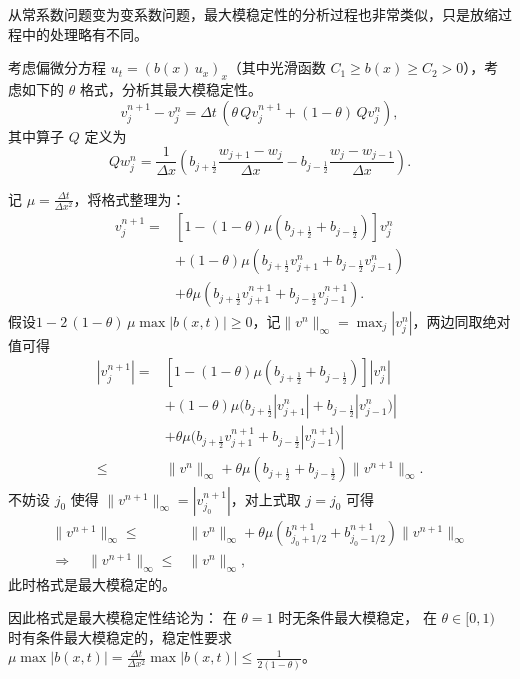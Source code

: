 从常系数问题变为变系数问题，最大模稳定性的分析过程也非常类似，只是放缩过程中的处理略有不同。

\begin{example}
    考虑偏微分方程 $u_t=(b(x)\, u_x)_x$（其中光滑函数 $C_1 \ge b(x) \ge C_2 > 0$），考虑如下的 $\theta$ 格式，分析其最大模稳定性。
    \[
        v^{n+1}_j - v^n_j = \Delta t\,(\theta\,Q v^{n+1}_j+(1-\theta)\, Q v^n_j),
    \]
    其中算子 $Q$ 定义为
    \[
        Q w^n_j=\frac{1}{\Delta x}\left(b_{j+\frac12}\frac{w_{j+1}-w_{j}}{\Delta x} - b_{j-\frac12}\frac{w_j-w_{j-1}}{\Delta x}\right).
    \]
\end{example}

\begin{solution*}
    记 $\mu = \frac{\Delta t}{\Delta x^2}$，将格式整理为：
    \begin{align*}
        [1+\theta \mu (b_{j+\frac12} + b_{j-\frac12})] v^{n+1}_j
        ={} & [1- (1-\theta) \mu (b_{j+\frac12}+b_{j-\frac12})] v^{n}_j                \\
            & + (1-\theta) \mu (b_{j+\frac12} v^n_{j+1} + b_{j-\frac12} v^n_{j-1})     \\
            & + \theta \mu (b_{j+\frac12} v^{n+1}_{j+1} + b_{j-\frac12} v^{n+1}_{j-1}).
    \end{align*}
    假设$1-2\,(1-\theta)\,\mu \max|b(x,t)|\ge0$，记$\|v^n\|_\infty = \max_j|v_j^n|$，两边同取绝对值可得
    \begin{align*}
        [1+\theta \mu (b_{j+\frac12} + b_{j-\frac12})] |v^{n+1}_j|
        ={}   & [1- (1-\theta) \mu (b_{j+\frac12}+b_{j-\frac12})] |v^{n}_j|                \\
              & + (1-\theta) \mu (b_{j+\frac12} |v^n_{j+1}| + b_{j-\frac12} |v^n_{j-1})|   \\
              & + \theta \mu (b_{j+\frac12} v^{n+1}_{j+1} + b_{j-\frac12} |v^{n+1}_{j-1})| \\
        \le{} & \|v^n\|_\infty
        + \theta \mu (b_{j+\frac12}  + b_{j-\frac12}) \|v^{n+1}\|_\infty.
    \end{align*}
    不妨设 $j_0$ 使得 $\|v^{n+1}\|_\infty = |v_{j_0}^{n+1}|$，对上式取 $j = j_0$ 可得
    \begin{align*}
        [1 + \theta \mu (b^{n+1}_{j_0+1/2}+b^{n+1}_{j_0-1/2})]\|v^{n+1}\|_\infty
        \le{}                                        & \|v^{n}\|_\infty + \theta \mu (b^{n+1}_{j_0+1/2}+b^{n+1}_{j_0-1/2})\|v^{n+1}\|_\infty \\
        \Rightarrow \quad   \|v^{n+1}\|_\infty \le{} & \|v^{n}\|_\infty,
    \end{align*}
    此时格式是最大模稳定的。

    因此格式是最大模稳定性结论为：
    在 $\theta=1$ 时无条件最大模稳定，
    在 $\theta \in [0,1)$ 时有条件最大模稳定的，稳定性要求 $\mu \max|b(x,t)| = \frac{\Delta t}{\Delta x^2} \max|b(x,t)| \le \frac{1}{2(1-\theta)}$。
\end{solution*}



